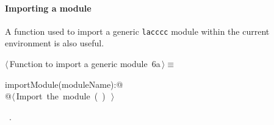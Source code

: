 \documentclass[11pt,oneside]{article}	%
\begin{document}
\paragraph{Importing a module} A function used to import a generic \texttt{lacccc} module within the current environment is also useful.
\begin{flushleft} \small
\begin{minipage}{\linewidth} \label{scrap14}
\protect{}$\langle\,$Function to import a generic module\nobreak\ {\footnotesize 6a}$\,\rangle\equiv$
\vspace{-1ex}
\begin{list}{}{} \item
\mbox{}\verb@def importModule(moduleName):@\\
\mbox{}\verb@   @\hbox{$\langle\,$Import the module\nobreak\ ({\footnotesize {}\label{scrap15}
 }\mbox{}\verb@moduleName@ ) {\footnotesize {}}$\,\rangle$}\verb@@\\
\mbox{}\verb@@{\NWsep}
\end{list}
\vspace{-1ex}
\footnotesize\addtolength{\baselineskip}{-1ex}
\begin{list}{}{\setlength{\itemsep}{-\parsep}\setlength{\itemindent}{-\leftmargin}}
\item \NWtxtMacroRefIn\ .
\end{list}
\end{minipage}\\[4ex]
\end{flushleft}
\end{document}
